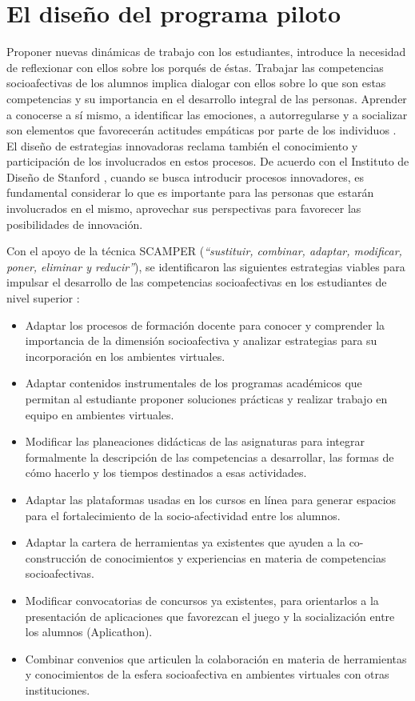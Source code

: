\documentclass{textolivre}
\begin{document}
\section{El diseño del programa piloto}
Proponer nuevas dinámicas de trabajo con los estudiantes, introduce la necesidad de reflexionar con ellos sobre los porqués de éstas. Trabajar las competencias socioafectivas de los alumnos implica dialogar con ellos sobre lo que son estas competencias y su importancia en el desarrollo integral de las personas. Aprender a conocerse a sí mismo, a identificar las emociones, a autorregularse y a socializar son elementos que favorecerán actitudes empáticas por parte de los individuos \cite{mikulic2015}. El diseño de estrategias innovadoras reclama también el conocimiento y participación de los involucrados en estos procesos. De acuerdo con el Instituto de Diseño de Stanford \cite[p. 5-6]{plattner2012}, cuando se busca introducir procesos innovadores, es fundamental considerar lo que es importante para las personas que estarán involucrados en el mismo, aprovechar sus perspectivas para favorecer las posibilidades de innovación.

Con el apoyo de la técnica SCAMPER (\emph{“sustituir, combinar, adaptar, modificar, poner, eliminar y reducir”}), \cite{mosqueda} se identificaron las siguientes estrategias viables para impulsar el desarrollo de las competencias socioafectivas en los estudiantes de nivel superior \cite{huertacuervo2020}: 

\begin{itemize}
    \item Adaptar los procesos de formación docente para conocer y comprender la importancia de la dimensión socioafectiva y analizar estrategias para su incorporación en los ambientes virtuales. 
    \item Adaptar contenidos instrumentales de los programas académicos que permitan al estudiante proponer soluciones prácticas y realizar trabajo en equipo en ambientes virtuales. 
    \item Modificar las planeaciones didácticas de las asignaturas para integrar formalmente la descripción de las competencias a desarrollar, las formas de cómo hacerlo y los tiempos destinados a esas actividades.  \item Adaptar las plataformas usadas en los cursos en línea para generar espacios para el fortalecimiento de la socio-afectividad entre los alumnos. 
    \item Adaptar la cartera de herramientas ya existentes que ayuden a la co-construcción de conocimientos y experiencias en materia de competencias socioafectivas. \item Modificar convocatorias de concursos ya existentes, para orientarlos a la presentación de aplicaciones que favorezcan el juego y la socialización entre los alumnos (Aplicathon).
    \item Combinar convenios que articulen la colaboración en materia de herramientas y conocimientos de la esfera socioafectiva en ambientes virtuales con otras instituciones.
\end{itemize}
\end{document}
